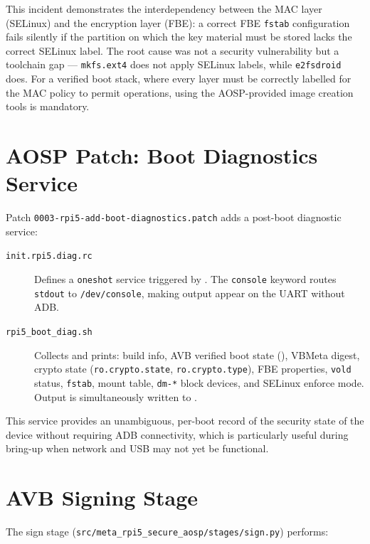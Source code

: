 This incident demonstrates the interdependency between the MAC layer (SELinux) and the encryption layer (FBE): a correct FBE \texttt{fstab} configuration fails silently if the partition on which the key material must be stored lacks the correct SELinux label. The root cause was not a security vulnerability but a toolchain gap --- \texttt{mkfs.ext4} does not apply SELinux labels, while \texttt{e2fsdroid} does. For a verified boot stack, where every layer must be correctly labelled for the MAC policy to permit operations, using the AOSP-provided image creation tools is mandatory.

\section{AOSP Patch: Boot Diagnostics Service}
\label{sec:impl_diagnostics}
Patch \texttt{0003-rpi5-add-boot-diagnostics.patch} adds a post-boot diagnostic service:

\begin{sloppypar}
\begin{description}
    \item[\texttt{init.rpi5.diag.rc}] Defines a \texttt{oneshot} service triggered by . The \texttt{console} keyword routes \texttt{stdout} to \texttt{/dev/console}, making output appear on the UART without ADB.
    \item[\texttt{rpi5\_boot\_diag.sh}] Collects and prints: build info, AVB verified boot state (), VBMeta digest, crypto state (\texttt{ro.crypto.state}, \texttt{ro.crypto.type}), FBE properties, \texttt{vold} status, \texttt{fstab}, mount table, \texttt{dm-*} block devices, and SELinux enforce mode. Output is simultaneously written to .
\end{description}
\end{sloppypar}

This service provides an unambiguous, per-boot record of the security state of the device without requiring ADB connectivity, which is particularly useful during bring-up when network and USB may not yet be functional.

\section{AVB Signing Stage}
\label{sec:impl_sign}

The sign stage (\texttt{src/meta\_rpi5\_secure\_aosp/stages/sign.py}) performs:

